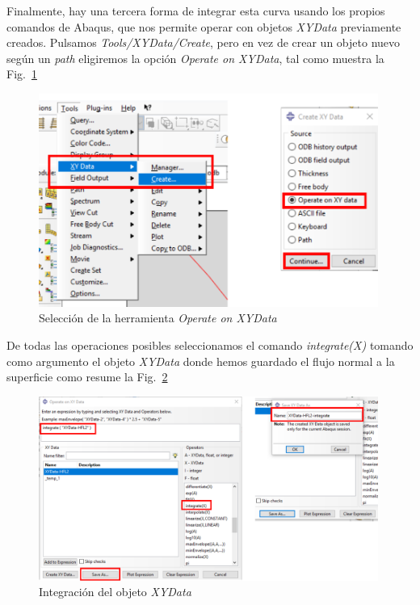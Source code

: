 \begin{itemize}
  Finalmente, hay una tercera forma de integrar esta curva usando los propios comandos de Abaqus, que nos permite operar con objetos \textit{XYData} previamente creados. Pulsamos \textit{Tools/XYData/Create}, pero en vez de crear un objeto nuevo según un \textit{path} eligiremos la opción \textit{Operate on XYData}, tal como muestra la Fig.~\ref{post26c}
   \begin{figure}[!h]
    \begin{center}
      \includegraphics[width=0.99\textwidth]{./body/images/post26c.pdf}
    \end{center}
    \caption{Selección de la herramienta \textit{Operate on XYData}}
    \label{post26c}
  \end{figure}

  De todas las operaciones posibles seleccionamos el comando \textit{integrate(X)} tomando como argumento el objeto \textit{XYData} donde hemos guardado el flujo normal a la superficie como resume la Fig.~\ref{post26d}
    \begin{figure}[!h]
    \begin{center}
      \includegraphics[width=0.99\textwidth]{./body/images/post26d.pdf}
    \end{center}
    \caption{Integración del objeto \textit{XYData}}
    \label{post26d}
  \end{figure}


\end{itemize}

